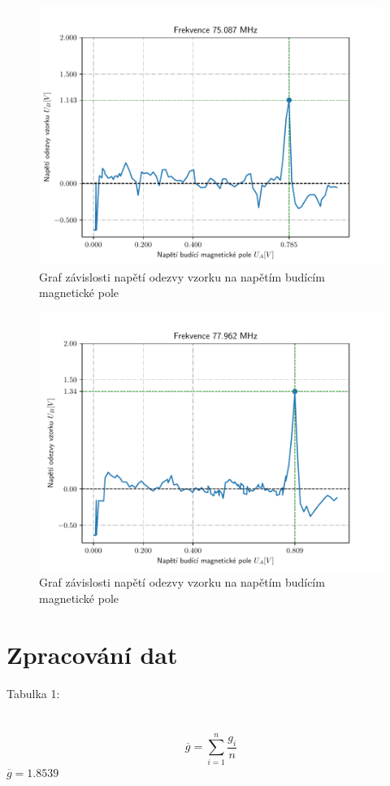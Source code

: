 \documentclass{article}
\begin{document}
\begin{figure}[!h]
  \hspace*{-10em}
  \includegraphics[scale=1.2]{figs/7.pdf}
  \caption{Graf závislosti napětí odezvy vzorku na napětím budícím magnetické pole}
\end{figure}
\clearpage
\begin{figure}[!h]
  \hspace*{-10em}
  \includegraphics[scale=1.2]{figs/8.pdf}
  \caption{Graf závislosti napětí odezvy vzorku na napětím budícím magnetické pole}
\end{figure}
\newpage

\section{Zpracování dat}
\footnotesize{Tabulka 1:}\\
\\
\vspace{1em}
\\
$$\overline{g} = \sum^{n}_{i=1}\frac{g_{i}}{n}$$
$\overline{g} = 1.8539$\\
\end{document}
